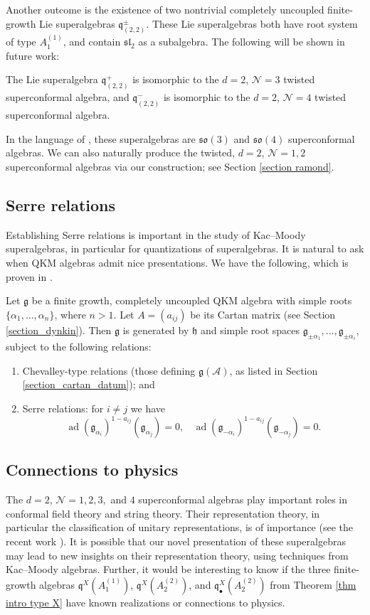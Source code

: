 \documentclass[12pt, a4paper, reqno]{amsart}
\def\AA{\mathcal{A}}
\def\NN{\mathcal{N}}
\def\q{\mathfrak{q}}
\def\g{\mathfrak{g}}
\def\h{\mathfrak{h}}
\def\l{\mathfrak{l}}
\def\s{\mathfrak{s}}
\def\o{\mathfrak{o}}
\theoremstyle{definition}
\theoremstyle{definition}
\theoremstyle{definition}
\numberwithin{theorem}{section}
\numberwithin{lemma}{section}
\numberwithin{remark}{section}
\numberwithin{definition}{section}
\numberwithin{corollary}{section}
\numberwithin{proposition}{section}
\numberwithin{example}{section}
\begin{document}
	Another outcome is the existence of two nontrivial completely uncoupled finite-growth Lie superalgebras $\q^{\pm}_{(2,2)}$.  These Lie superalgebras both have root system of type $A^{(1)}_{1}$, and contain $\widehat{\s\l}_{2}$ as a subalgebra. The following will be shown in future work:
	\begin{theorem}\label{thm superconformal}
			The Lie superalgebra $\q_{(2,2)}^+$ is isomorphic to the $d=2$, $\NN=3$ twisted superconformal algebra, and $\q_{(2,2)}^-$ is isomorphic to the $d=2$, $\NN=4$ twisted superconformal algebra.
	\end{theorem} 

  In the language of \cite{KL}, these superalgebras are $\s\o(3)$ and $\s\o(4)$ superconformal algebras.  We can also naturally produce the twisted, $d=2$, $\NN=1,2$ superconformal algebras via our construction; see Section \ref{section ramond}.
	
	\subsection{Serre relations} Establishing Serre relations is important in the study of Kac--Moody superalgebras, in particular for quantizations of superalgebras.  It is natural to ask when QKM algebras admit nice presentations.  We have the following, which is proven in \cite{Si}.
	
	\begin{theorem}
		Let $\g$ be a finite growth, completely uncoupled QKM algebra with simple roots $\{\alpha_1,\dots,\alpha_n\}$, where $n>1$. Let $A=(a_{ij})$ be its Cartan matrix (see Section \ref{section_dynkin}).  Then $\g$ is generated by $\h$ and simple root spaces $\g_{\pm\alpha_1},\dots,\g_{\pm\alpha_i}$, subject to the following relations:
		\begin{enumerate}
			\item Chevalley-type relations (those defining $\g(\AA)$, as listed in Section \ref{section_cartan_datum}); and
			\item Serre relations: for $i\neq j$ we have
			\[
			\operatorname{ad}(\g_{\alpha_i})^{1-a_{ij}}(\g_{\alpha_j})=0,  \ \ \ \ \operatorname{ad}(\g_{-\alpha_i})^{1-a_{ij}}(\g_{-\alpha_j})=0.
			\]
		\end{enumerate}
	\end{theorem}
	
	\subsection{Connections to physics}  The $d=2$, $\NN=1,2,3,$ and $4$ superconformal algebras play important roles in conformal field theory and string theory.  Their representation theory, in particular the classification of unitary representations, is of importance (see the recent work \cite{KFP}).  It is possible that our novel presentation of these superalgebras may lead to new insights on their representation theory, using techniques from Kac--Moody algebras.  Further, it would be interesting to know if the three finite-growth algebras $\q^X(A_{1}^{(1)})$, $\q^X(A_{2}^{(2)})$, and $\q_{\bullet}^X(A_{2}^{(2)})$ from Theorem \ref{thm intro type X} have known realizations or connections to physics.  
	
\end{document}
